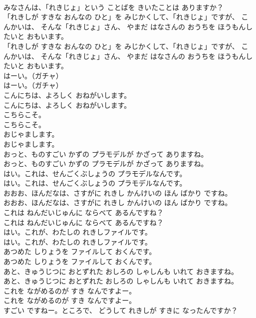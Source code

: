 \documentclass[8pt]{extreport}
\begin{document}
\begin{CJK}{UTF8}{min}
\\	みなさんは、「れきじょ」という ことばを きいたことは ありますか？
\\	「れきしが すきな おんなの ひと」を みじかくして、「れきじょ」ですが、 こんかいは、 そんな「れきじょ」さん、 やまだ はなさんの おうちを ほうもんしたいと おもいます。
\\	「れきしが すきな おんなの ひと」を みじかくして、「れきじょ」ですが、 こんかいは、 そんな「れきじょ」さん、 やまだ はなさんの おうちを ほうもんしたいと おもいます。
\\	はーい。（ガチャ）
\\	はーい。（ガチャ）
\\	こんにちは、よろしく おねがいします。
\\	こんにちは、よろしく おねがいします。
\\	こちらこそ。
\\	こちらこそ。
\\	おじゃまします。
\\	おじゃまします。
\\	おっと、ものすごい かずの プラモデルが かざって ありますね。
\\	おっと、ものすごい かずの プラモデルが かざって ありますね。
\\	はい。これは、せんごくぶしょうの プラモデルなんです。
\\	はい。これは、せんごくぶしょうの プラモデルなんです。
\\	おおお、ほんだなは、さすがに れきし かんけいの ほん ばかり ですね。
\\	おおお、ほんだなは、さすがに れきし かんけいの ほん ばかり ですね。
\\	これは ねんだいじゅんに ならべて あるんですね？
\\	これは ねんだいじゅんに ならべて あるんですね？
\\	はい。これが、わたしの れきしファイルです。
\\	はい。これが、わたしの れきしファイルです。
\\	あつめた しりょうを ファイルして おくんです。
\\	あつめた しりょうを ファイルして おくんです。
\\	あと、きゅうじつに おとずれた おしろの しゃしんも いれて おきますね。
\\	あと、きゅうじつに おとずれた おしろの しゃしんも いれて おきますね。
\\	これを ながめるのが すき なんですよー。
\\	これを ながめるのが すき なんですよー。
\\	すごい ですねー。ところで、 どうして れきしが すきに なったんですか？

\end{CJK}
\end{document}
